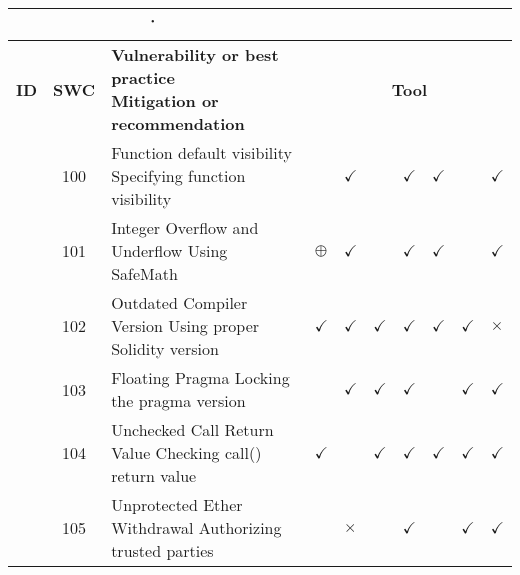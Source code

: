 
\newcommand{\BP}{BP}
\newcommand{\falsepos}{$\oplus$}
\newcommand{\failed}{$\times$}
\newcommand{\noSWC}{$\bigcirc$} 
\newcommand{\notcovered}{}
\newcommand{\passed}{$\checkmark$}


\begin{table*}
\centering
\begin{adjustbox}{max height=10cm}
\begin{tabular}{|c|c|m{9cm}|m{5mm}|m{5mm}|m{5mm}|m{5mm}|m{5mm}|m{5mm}|m{5mm}|}

\multicolumn{3}{c}{\.} &
\headrow{EY Review} &
\headrow{Smart Check} &
\headrow{Securify} &
\headrow{MythX (Mythril)} &
\headrow{Contract Guard} &
\headrow{Slither} &
\headrow{Odin} \\ \hline

\textbf{ID} & 
\textbf{SWC} & 
\textbf{Vulnerability or best practice \newline Mitigation or recommendation} &  
\multicolumn{7}{c|}{\textbf{Tool}} \\
\hline
			\hline\centering 1 & 100 & Function default visibility \newline Specifying function visibility & \notcovered & \passed & \notcovered & \passed & \passed & \notcovered & \passed \\
			\hline\centering 2 & 101 & Integer Overflow and Underflow \newline Using SafeMath & \falsepos & \passed & \notcovered & \passed & \passed & \notcovered & \passed \\
			\hline\centering 3 & 102 & Outdated Compiler Version \newline Using proper Solidity version & \passed & \passed & \passed & \passed & \passed & \passed & \failed \\
			\hline\centering 4 & 103 & Floating Pragma \newline Locking the pragma version & \notcovered & \passed & \passed & \passed & \notcovered & \passed & \passed \\
			\hline\centering 5 & 104 & Unchecked Call Return Value \newline Checking call() return value & \passed & \notcovered & \passed & \passed & \passed & \passed & \passed \\
			\hline\centering 6 & 105 & Unprotected Ether Withdrawal \newline Authorizing trusted parties & \notcovered & \failed & \notcovered & \passed & \notcovered & \passed & \passed \\

\end{tabular}
\end{adjustbox}
\end{table*}
